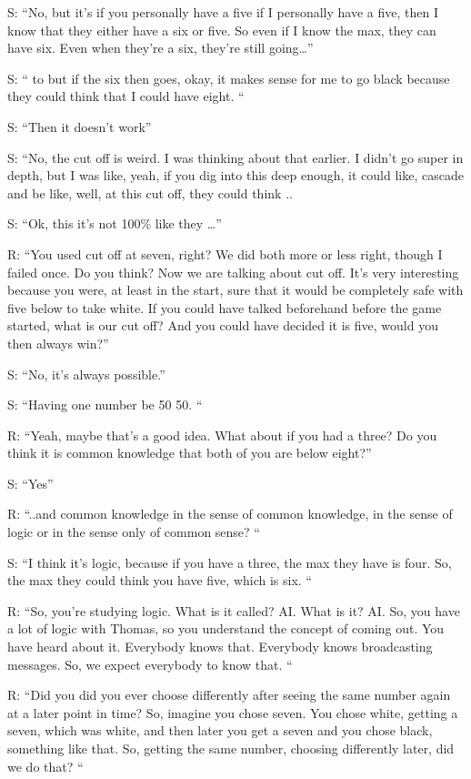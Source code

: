 S: “No, but it's if you personally have a five if I personally have a five, then I know that they either have a six or five. So even if I know the max, they can have six. Even when they're a six, they're still going…”

S: “ to but if the six then goes, okay, it makes sense for me to go black because they could think that I could have eight. “

S: “Then it doesn't work”

S: “No, the cut off is weird. I was thinking about that earlier. I didn't go super in depth, but I was like, yeah, if you dig into this deep enough, it could like, cascade and be like, well, at this cut off, they could think ..

S: “Ok, this it's not 100\% like they …”

R: “You used cut off at seven, right? We did both more or less right, though I failed once. Do you think? Now we are talking about cut off. It's very interesting because you were, at least in the start, sure that it would be completely safe with five below to take white. If you could have talked beforehand before the game started, what is our cut off? And you could have decided it is five, would you then always win?” 

S: “No, it's always possible.” 

S: “Having one number be 50 50. “

R: “Yeah, maybe that's a good idea. What about if you had a three? Do you think it is common knowledge that both of you are below eight?”

S: “Yes”

R: “..and common knowledge in the sense of common knowledge, in the sense of logic or in the sense only of common sense? “

S: “I think it's logic, because if you have a three, the max they have is four. So, the max they could think you have five, which is six. “

R: “So, you're studying logic. What is it called? AI. What is it? AI. So, you have a lot of logic with Thomas, so you understand the concept of coming out. You have heard about it. Everybody knows that. Everybody knows broadcasting messages. So, we expect everybody to know that. “

R: “Did you did you ever choose differently after seeing the same number again at a later point in time? So, imagine you chose seven. You chose white, getting a seven, which was white, and then later you get a seven and you chose black, something like that. So, getting the same number, choosing differently later, did we do that? “

